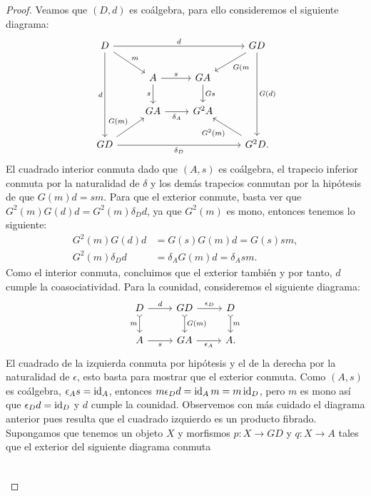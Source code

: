 \begin{proof}
  Veamos que $(D,d)$ es coálgebra, para ello consideremos el siguiente diagrama:
  \begin{equation*}
    \begin{tikzcd}
      D\ar{rrr}{d}\ar[swap]{ddd}{d}\ar{rd}{m} & {} & {} & GD\ar{ddd}{G(d)}\ar{ld}{G(m} \\
      {} & A\ar{r}{s}\ar[swap]{d}{s} & GA\ar{d}{Gs} & {} \\
      {} & GA\ar[swap]{r}{\delta_A} & G^2A & {} \\
      GD\ar[swap]{rrr}{\delta_D}\ar{ru}{G(m)} & {} & {} & G^2D.\ar{lu}{G^2(m)}
    \end{tikzcd}
  \end{equation*}
  El cuadrado interior conmuta dado que $(A,s)$ es coálgebra, el trapecio inferior conmuta por la
  naturalidad de $\delta$ y los demás trapecios conmutan por la hipótesis de que $G(m)d=sm$. Para que
  el exterior conmute, basta ver que $G^2(m)G(d)d=G^2(m)\delta_Dd$, ya que $G^2(m)$ es mono, entonces
  tenemos lo siguiente:
  \begin{align*}
    G^2(m)G(d)d &= G(s)G(m)d = G(s)sm, \\
    G^2(m)\delta_Dd &= \delta_A G(m)d = \delta_Asm.
  \end{align*}
  Como el interior conmuta, concluimos que el exterior también y por tanto, $d$ cumple la coasociatividad.
  Para la counidad, consideremos el siguiente diagrama:
  \begin{equation*}
    \begin{tikzcd}
      D\ar{r}{d}\ar[swap,tail]{d}{m} & GD\ar{r}{\epsilon_D}\ar[tail]{d}{G(m)} & D\ar[tail]{d}{m} \\
      A\ar[swap]{r}{s} & GA\ar[swap]{r}{\epsilon_A} & A.
    \end{tikzcd}
  \end{equation*}
  El cuadrado de la izquierda conmuta por hipótesis y el de la derecha por la naturalidad de $\epsilon$,
  esto basta para mostrar que el exterior conmuta. Como $(A,s)$ es coálgebra, $\epsilon_As=\operatorname{id}_A$, entonces 
  $m\epsilon_Dd=\operatorname{id}_Am=m \operatorname{id}_D$, pero $m$ es mono así que $\epsilon_Dd=\operatorname{id}_D$ y $d$ cumple la counidad.
  Observemos con más cuidado el diagrama anterior pues resulta que el cuadrado izquierdo es un producto fibrado.
  Supongamos que tenemos un objeto $X$ y morfismos $p\colon X\to GD$ y $q\colon
  X\to A$ tales que el exterior del siguiente diagrama conmuta
  \begin{equation*}
    \begin{tikzcd}

\end{tikzcd}
\end{equation*}
\end{proof}
